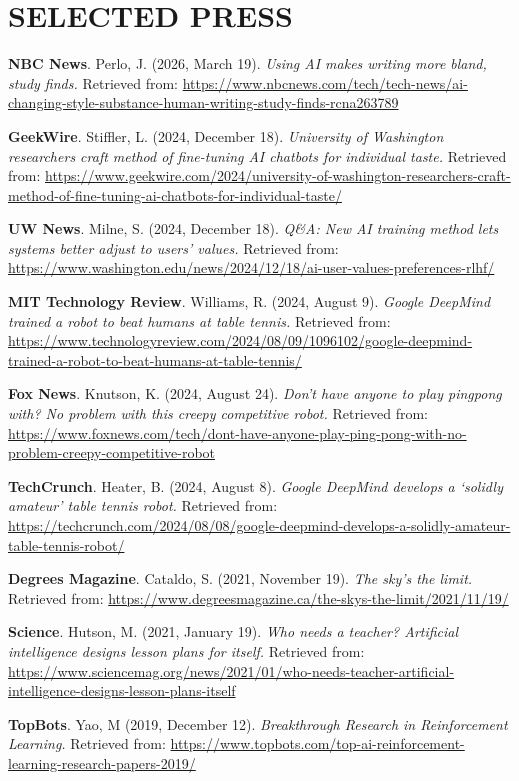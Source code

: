 \documentclass[paper=letter,fontsize=11pt]{scrartcl} %
\newcommand{\NewPart}[2]{\section*{\uppercase{#1} #2}}
\newcommand{\PressEntry}[5]{
		\noindent \textbf{#5}. #1 (#2). \textit{#3} Retrieved from: \url{#4}}
\begin{document}
\NewPart{Selected Press}{}
\begin{etaremune}
\item\PressEntry{Perlo, J.}{2026, March 19}{Using AI makes writing more bland, study finds.}{https://www.nbcnews.com/tech/tech-news/ai-changing-style-substance-human-writing-study-finds-rcna263789}{NBC News}

\item\PressEntry{Stiffler, L.}{2024, December 18}{University of Washington researchers craft method of fine-tuning AI chatbots for individual taste.}{https://www.geekwire.com/2024/university-of-washington-researchers-craft-method-of-fine-tuning-ai-chatbots-for-individual-taste/}{GeekWire}

\item\PressEntry{Milne, S.}{2024, December 18}{Q\&A: New AI training method lets systems better adjust to users’ values.}{https://www.washington.edu/news/2024/12/18/ai-user-values-preferences-rlhf/}{UW News}

\item\PressEntry{Williams, R.}{2024, August 9}{Google DeepMind trained a robot to beat humans at table tennis.}{https://www.technologyreview.com/2024/08/09/1096102/google-deepmind-trained-a-robot-to-beat-humans-at-table-tennis/}{MIT Technology Review}

\item\PressEntry{Knutson, K.}{2024, August 24}{Don't have anyone to play pingpong with? No problem with this creepy competitive robot.}{https://www.foxnews.com/tech/dont-have-anyone-play-ping-pong-with-no-problem-creepy-competitive-robot}{Fox News}

\item\PressEntry{Heater, B.}{2024, August 8}{Google DeepMind develops a ‘solidly amateur’ table tennis robot.}{https://techcrunch.com/2024/08/08/google-deepmind-develops-a-solidly-amateur-table-tennis-robot/}{TechCrunch}

\item\PressEntry{Cataldo, S.}{2021, November 19}{The sky’s the limit.}{https://www.degreesmagazine.ca/the-skys-the-limit/2021/11/19/}{Degrees Magazine}

\item\PressEntry{Hutson, M.}{2021, January 19}{Who needs a teacher? Artificial intelligence designs lesson plans for itself.}{https://www.sciencemag.org/news/2021/01/who-needs-teacher-artificial-intelligence-designs-lesson-plans-itself}{Science}

\item\PressEntry{Yao, M}{2019, December 12}{Breakthrough Research in Reinforcement Learning.}{https://www.topbots.com/top-ai-reinforcement-learning-research-papers-2019/}{TopBots}


\end{etaremune}
\end{document}
